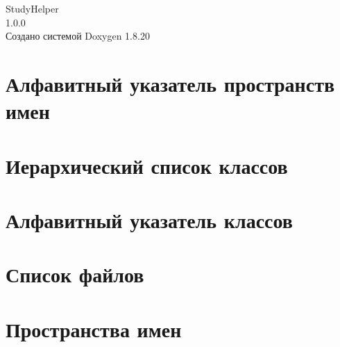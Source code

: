 \let\mypdfximage\pdfximage\def\pdfximage{\immediate\mypdfximage}\documentclass[twoside]{book}
\newcommand{\+}{\discretionary{\mbox{\scriptsize$\hookleftarrow$}}{}{}}
\newcommand{\clearemptydoublepage}{%
  \newpage{\pagestyle{empty}\cleardoublepage}%
}
\begin{document}
\hypersetup{pageanchor=false,
             bookmarksnumbered=true,
             pdfencoding=unicode
            }
\begin{titlepage}
\vspace*{7cm}
\begin{center}%
{\Large Study\+Helper \\[1ex]\large 1.\+0.\+0 }\\
\vspace*{1cm}
{\large Создано системой Doxygen 1.8.20}\\
\end{center}
\end{titlepage}
\clearemptydoublepage
{}
\tableofcontents
\clearemptydoublepage
{}
\hypersetup{pageanchor=true}

\chapter{Алфавитный указатель пространств имен}

\chapter{Иерархический список классов}

\chapter{Алфавитный указатель классов}

\chapter{Список файлов}

\chapter{Пространства имен}






\end{document}
